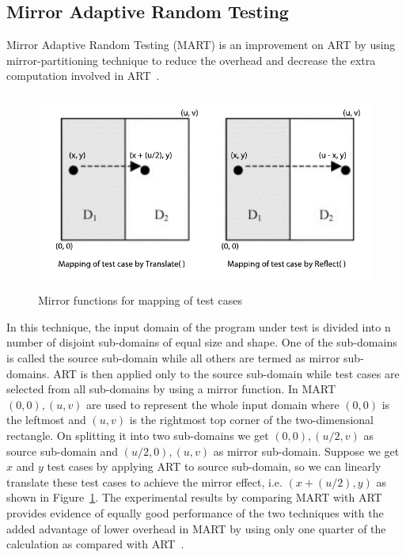 \subsection{Mirror Adaptive Random Testing}
Mirror Adaptive Random Testing (MART) is an improvement on ART by using mirror-partitioning technique to reduce the overhead and decrease the extra computation involved in ART~\cite{chen2004mirror}. 
\bigskip
\bigskip
\begin{figure}[h]
\begin{center}
	\includegraphics[width=13.5cm, height=6.5cm ]{chapter2/mart2.pdf}
	\bigskip
	\caption{Mirror functions for mapping of test cases}
\label{fig:mirrorART}
\end{center}  
\end{figure}
\bigskip

In this technique, the input domain of the program under test is divided into n number of disjoint sub-domains of equal size and shape. One of the sub-domains is called the source sub-domain while all others are termed as mirror sub-domains. ART is then applied only to the source sub-domain while test cases are selected from all sub-domains by using a mirror function. In MART $(0, 0), (u, v)$ are used to represent the whole input domain where $(0, 0)$ is the leftmost and $(u, v)$ is the rightmost top corner of the two-dimensional rectangle. On splitting it into two sub-domains we get $(0, 0), (u/2, v)$ as source sub-domain and $(u/2, 0), (u, v)$ as mirror sub-domain. Suppose we get $x$ and $y$ test cases by applying ART to source sub-domain, so we can linearly translate these test cases to achieve the mirror effect, i.e. $(x + (u/2), y)$ as shown in Figure~\ref{fig:mirrorART}. The experimental results by comparing MART with ART provides evidence of equally good performance of the two techniques with the added advantage of lower overhead in MART by using only one quarter of the calculation as compared with ART~\cite{chen2004mirror}.


